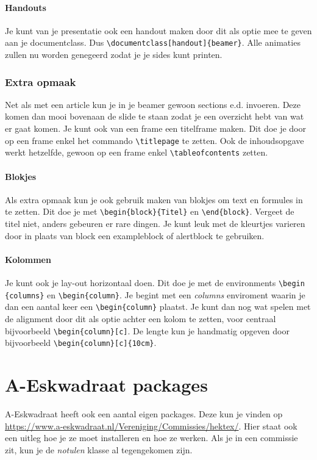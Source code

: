 \documentclass{article}
\begin{document}
\paragraph{Handouts}
Je kunt van je presentatie ook een handout maken door dit als optie mee te geven aan je documentclass. Dus \verb+\documentclass[handout]{beamer}+. Alle animaties zullen nu worden genegeerd zodat je je sides kunt printen.
\subsubsection*{Extra opmaak}
Net als met een article kun je in je beamer gewoon sections e.d. invoeren. Deze komen dan mooi bovenaan de slide te staan zodat je een overzicht hebt van wat er gaat komen. Je kunt ook van een frame een titelframe maken. Dit doe je door op een frame enkel het commando \verb+\titlepage+ te zetten. Ook de inhoudsopgave werkt hetzelfde, gewoon op een frame enkel \verb+\tableofcontents+ zetten.
\paragraph{Blokjes}
Als extra opmaak kun je ook gebruik maken van blokjes om text en formules in te zetten. Dit doe je met \verb+\begin{block}{Titel}+ en \verb+\end{block}+. Vergeet de titel niet, anders gebeuren er rare dingen. Je kunt leuk met de kleurtjes varieren door in plaats van block een exampleblock of alertblock te gebruiken.
\paragraph{Kolommen}
Je kunt ook je lay-out horizontaal doen. Dit doe je met de environments \verb+\begin+ \verb+{columns}+ en \verb+\begin{column}+. Je begint met een \emph{columns} enviroment waarin je dan een aantal keer een \verb+\begin{column}+
plaatst. Je kunt dan nog wat spelen met de alignment door dit als optie achter een kolom te zetten, voor centraal bijvoorbeeld \verb+\begin{column}[c]+. De lengte kun je handmatig opgeven door bijvoorbeeld \verb+\begin{column}[c]{10cm}+.

\section{A-Eskwadraat packages}
\label{aes2}
A-Eskwadraat heeft ook een aantal eigen packages. Deze kun je vinden op \url{https://www.a-eskwadraat.nl/Vereniging/Commissies/hektex/}. Hier staat ook een uitleg hoe je ze moet installeren en hoe ze werken. Als je in een commissie zit, kun je de \emph{notulen} klasse al tegengekomen zijn.
\end{document}
